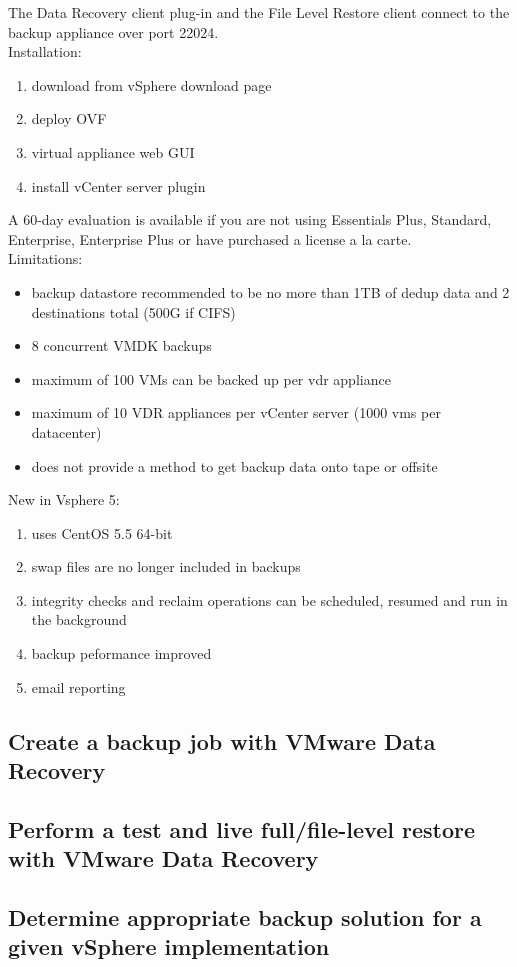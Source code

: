The Data Recovery client plug-in and the File Level Restore client connect
to the backup appliance over port 22024.\\

Installation:

\begin{enumerate}
\item download from vSphere download page
\item deploy OVF
\item virtual appliance web GUI
\item install vCenter server plugin
\end{enumerate}

A 60-day evaluation is available if you are not using Essentials Plus,
Standard, Enterprise, Enterprise Plus or have purchased a license a la carte.\\

Limitations:

\begin{itemize}

\item backup datastore recommended to be no more than 1TB of dedup data and
2 destinations total (500G if CIFS)

\item 8 concurrent VMDK backups

\item maximum of 100 VMs can be backed up per vdr appliance

\item maximum of 10 VDR appliances per vCenter server (1000 vms per datacenter)

\item does not provide a method to get backup data onto tape or offsite

\end{itemize}

New in Vsphere 5:

\begin{enumerate}

\item uses CentOS 5.5 64-bit

\item swap files are no longer included in backups

\item integrity checks and reclaim operations can be scheduled, resumed and
run in the background

\item backup peformance improved

\item email reporting

\end{enumerate}

\subsection{Create a backup job with VMware Data Recovery}

\subsection{Perform a test and live full/file-level restore with VMware Data Recovery}

\subsection{Determine appropriate backup solution for a given vSphere implementation}
